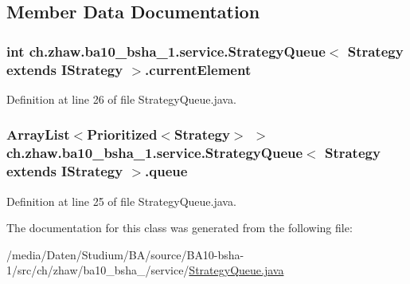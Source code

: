\subsection{Member Data Documentation}
\hypertarget{classch_1_1zhaw_1_1ba10__bsha__1_1_1service_1_1StrategyQueue_3_01Strategy_01extends_01IStrategy_01_4_ad91c57b63849448bf5f255fc077eaca1}{
\subsubsection[{currentElement}]{\setlength{\rightskip}{0pt plus 5cm}int ch.zhaw.ba10\_\-bsha\_\-1.service.StrategyQueue$<$ Strategy extends {\bf IStrategy} $>$.{\bf currentElement}}}
\label{classch_1_1zhaw_1_1ba10__bsha__1_1_1service_1_1StrategyQueue_3_01Strategy_01extends_01IStrategy_01_4_ad91c57b63849448bf5f255fc077eaca1}


Definition at line 26 of file StrategyQueue.java.\hypertarget{classch_1_1zhaw_1_1ba10__bsha__1_1_1service_1_1StrategyQueue_3_01Strategy_01extends_01IStrategy_01_4_a2a1363a6e0f87ad69ee2734381cfa657}{
\subsubsection[{queue}]{\setlength{\rightskip}{0pt plus 5cm}ArrayList$<$Prioritized$<$Strategy$>$ $>$ ch.zhaw.ba10\_\-bsha\_\-1.service.StrategyQueue$<$ Strategy extends {\bf IStrategy} $>$.{\bf queue}}}
\label{classch_1_1zhaw_1_1ba10__bsha__1_1_1service_1_1StrategyQueue_3_01Strategy_01extends_01IStrategy_01_4_a2a1363a6e0f87ad69ee2734381cfa657}


Definition at line 25 of file StrategyQueue.java.

The documentation for this class was generated from the following file:\begin{DoxyCompactItemize}
\item 
/media/Daten/Studium/BA/source/BA10-\/bsha-\/1/src/ch/zhaw/ba10\_\-bsha\_/service/\hyperlink{StrategyQueue_8java}{StrategyQueue.java}\end{DoxyCompactItemize}
